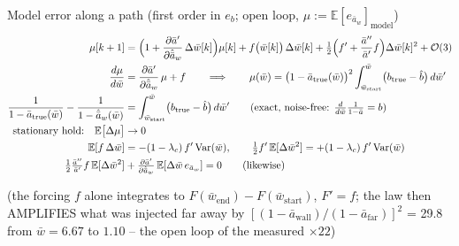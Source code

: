 \documentclass[11pt,a4paper,fontset=none]{ctexart}
\newcommand{\ba}{\bar{a}}
\newcommand{\bw}{\bar{w}}
\newcommand{\E}{\mathbb{E}}
\newcommand{\dW}{\Delta\bw}
\newcommand{\ap}{\ba'}
\newcommand{\app}{\ba''}
\begin{document}
Model error along a path (first order in $e_b$; open loop, $\mu := \E[e_{\ba_w}]_{\text{model}}$)
\begin{align*}
\mu[k+1] &= \Bigl(1 + \frac{\partial\ap}{\partial\hat{\ba}_w}\,\dW[k]\Bigr)\mu[k] + f\bigl(\bw[k]\bigr)\,\dW[k] + \tfrac{1}{2}\Bigl(f' + \frac{\app}{\ap}f\Bigr)\dW[k]^{2} + \mathcal{O}(3) \\
\frac{d\mu}{d\bw} &= \frac{\partial\ap}{\partial\hat{\ba}_w}\,\mu + f
  \qquad\Longrightarrow\qquad
  \mu(\bw) = \bigl(1 - \ba_{\mathrm{true}}(\bw)\bigr)^{2}\int_{\bw_{\mathrm{start}}}^{\bw}\bigl(b_{\mathrm{true}} - \hat{b}\bigr)\,d\bw' \\
\frac{1}{1 - \ba_{\mathrm{true}}(\bw)} - \frac{1}{1 - \hat{\ba}_w(\bw)} &= \int_{\bw_{\mathrm{start}}}^{\bw}\bigl(b_{\mathrm{true}} - \hat{b}\bigr)\,d\bw'
  \qquad (\text{exact, noise-free: } \tfrac{d}{d\bw}\tfrac{1}{1-\ba} = b) \\
\text{stationary hold:}\quad \E\bigl[\Delta\mu\bigr] &\to 0 \\
  \E[f\,\dW] &= -(1-\lambda_c)\,f'\,\mathrm{Var}(\bw) , \qquad \tfrac{1}{2}f'\,\E[\dW^{2}] = +(1-\lambda_c)\,f'\,\mathrm{Var}(\bw) \\
  \tfrac{1}{2}\tfrac{\app}{\ap}f\,\E[\dW^{2}] &+ \tfrac{\partial\ap}{\partial\hat{\ba}_w}\,\E[\dW\,e_{\ba_w}] = 0 \qquad (\text{likewise})
\end{align*}

(the forcing $f$ alone integrates to $F(\bw_{\mathrm{end}}) - F(\bw_{\mathrm{start}})$, $F' = f$; the law then AMPLIFIES what was injected
far away by $[(1-\ba_{\mathrm{wall}})/(1-\ba_{\mathrm{far}})]^{2}$ = 29.8 from $\bw = 6.67$ to $1.10$ -- the open loop of the measured $\times 22$)
\end{document}
